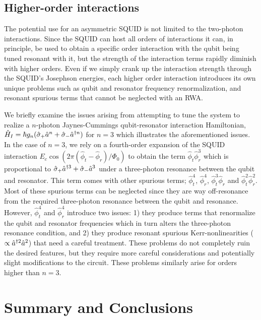 {\subsection{Higher-order interactions}}
The potential use for an asymmetric SQUID is not limited to the two-photon interactions. {Since the SQUID can host all orders of interactions it can, in principle, be used to obtain a specific order interaction with the qubit being tuned resonant with it, but the strength of the interaction terms rapidly diminish with higher orders. Even if we simply crank up the interaction strength through the SQUID's Josephson energies, each higher order interaction introduces its own unique problems such as qubit and resonator frequency renormalization, and resonant spurious terms that cannot be neglected with an RWA.}

{We briefly examine the issues arising from attempting to tune the system to realize a $n$-photon Jaynes-Cummings qubit-resonator interaction Hamiltonian, $\hat{H}_I=\hbar g_n(\hat{\sigma}_+\hat{a}^n + \hat{\sigma}_-\hat{a}^{\dagger n})$ for $n=3$ which illustrates the aforementioned issues. In the case of $n=3$, we rely on a fourth-order expansion of the SQUID interaction $E_{c}\cos({2\pi ( \hat{\phi}_t-\hat{\phi}_r)}/{\Phi_0})$  to obtain the term $\hat{\phi}_t\hat{\phi}_r^3$ which is proportional to $\hat{\sigma}_+\hat{a}^{\dagger 3} +\hat{\sigma}_-\hat{a}^3$ under a three-photon resonance between the qubit and resonator. This term comes with other spurious terms; $\hat{\phi}_t^4$, $\hat{\phi}_r^4$, $\hat{\phi}_t^3\hat{\phi}_r$ and $\hat{\phi}_t^2\hat{\phi}_r^2$. Most of these spurious terms can be neglected since they are way off-resonance from the required three-photon resonance between the qubit and resonance. However, $\hat{\phi}_t^4$ and $\hat{\phi}_r^4$ introduce two issues: 1) they produce terms that renormalize the qubit and resonator frequencies which in turn alters the three-photon resonance condition, and 2) they produce resonant spurious Kerr-nonlinearities ($\propto \hat{a}^{\dagger 2}\hat{a}^2$) that need a careful treatment. These problems do not completely ruin the desired features, but they require more careful considerations and potentially slight modifications to the circuit. These problems similarly arise for orders higher than $n=3$. }
\\


\section{Summary and Conclusions}\label{sec:Conc}

